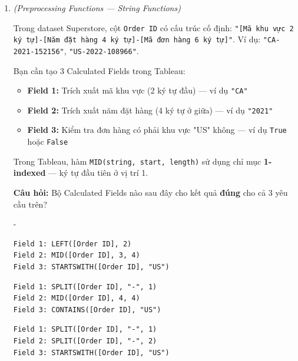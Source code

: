 \documentclass[12pt]{article}
\newcounter{choice}
\renewcommand\thechoice{($\alph{choice}$)}
\newcommand\choicelabel{\thechoice}
\newenvironment{choices}%
  {\list{\choicelabel}%
     {\usecounter{choice}\def\makelabel##1{\hss\llap{##1}}%
       \settowidth{\leftmargin}{W.\hskip\labelsep\hskip 0 em}%
       \def\choice{%
         \item
       } %
       \labelwidth\leftmargin\advance\labelwidth-\labelsep
       \topsep=0pt
       \partopsep=0pt
     }%
  }%
  {\endlist}
\begin{document}
\begin{enumerate}[label=\textbf{Câu \arabic*.}, leftmargin=*, labelsep=1em, itemsep=2em]


\item \textit{(Preprocessing Functions --- String Functions)}

Trong dataset Superstore, cột \texttt{Order ID} có cấu trúc cố định: \texttt{"[Mã khu vực 2 ký tự]-[Năm đặt hàng 4 ký tự]-[Mã đơn hàng 6 ký tự]"}. Ví dụ: \texttt{"CA-2021-152156"}, \texttt{"US-2022-108966"}.

Bạn cần tạo 3 Calculated Fields trong Tableau:
\begin{itemize}
    \item \textbf{Field 1:} Trích xuất mã khu vực (2 ký tự đầu) --- ví dụ \texttt{"CA"}
    \item \textbf{Field 2:} Trích xuất năm đặt hàng (4 ký tự ở giữa) --- ví dụ \texttt{"2021"}
    \item \textbf{Field 3:} Kiểm tra đơn hàng có phải khu vực "US" không --- ví dụ \texttt{True} hoặc \texttt{False}
\end{itemize}

\begin{notebox}
Trong Tableau, hàm \texttt{MID(string, start, length)} sử dụng chỉ mục \textbf{1-indexed} --- ký tự đầu tiên ở vị trí 1.
\end{notebox}

\textbf{Câu hỏi:} Bộ Calculated Fields nào sau đây cho kết quả \textbf{đúng} cho cả 3 yêu cầu trên?

\begin{choices}
    \choice
    \begin{lstlisting}[style=tableau]
Field 1: LEFT([Order ID], 2)
Field 2: MID([Order ID], 3, 4)
Field 3: STARTSWITH([Order ID], "US")
    \end{lstlisting}

    \choice
    \begin{lstlisting}[style=tableau]
Field 1: SPLIT([Order ID], "-", 1)
Field 2: MID([Order ID], 4, 4)
Field 3: CONTAINS([Order ID], "US")
    \end{lstlisting}

    \choice
    \begin{lstlisting}[style=tableau]
Field 1: SPLIT([Order ID], "-", 1)
Field 2: SPLIT([Order ID], "-", 2)
Field 3: STARTSWITH([Order ID], "US")
    \end{lstlisting}


\end{choices}
\end{enumerate}
\end{document}
